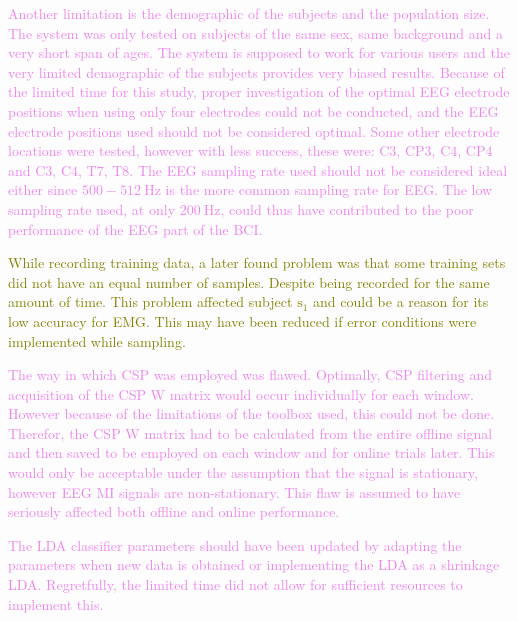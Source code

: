 \textcolor{violet}{Another limitation is the demographic of the subjects and the population size. The system was only tested on subjects of the same sex, same background and a very short span of ages. The system is supposed to work for various users and the very limited demographic of the subjects provides very biased results.}
\textcolor{violet}{Because of the limited time for this study, proper investigation of the optimal EEG electrode positions when using only four electrodes could not be conducted, and the EEG electrode positions used should not be considered optimal. Some other electrode locations were tested, however with less success, these were: $\text{C}3$, $\text{CP}3$, $\text{C}4$, $\text{CP}4$ and $\text{C}3$, $\text{C}4$, $\text{T}7$, $\text{T}8$. The EEG sampling rate used should not be considered ideal either since $500-512\:\text{Hz}$ is the more common sampling rate for EEG\:\cite{leebHybridBrainComputer2011}\cite{gordleevaRealTimeEEGEMG2020}\cite{zhangEEGEMGEOGBased2019}. The low sampling rate used, at only $200\:\text{Hz}$, could thus have contributed to the poor performance of the EEG part of the BCI.}

\textcolor{olive}{While recording training data, a later found problem was that some training sets did not have an equal number of samples. Despite being recorded for the same amount of time. This problem affected subject $\text{s}_1$ and could be a reason for its low accuracy for EMG. This may have been reduced if error conditions were implemented while sampling.}

\textcolor{violet}{The way in which CSP was employed was flawed. Optimally, CSP filtering and acquisition of the CSP W matrix would occur individually for each window. However because of the limitations of the toolbox used, this could not be done. Therefor, the CSP W matrix had to be calculated from the entire offline signal and then saved to be employed on each window and for online trials later. This would only be acceptable under the assumption that the signal is stationary, however EEG MI signals are non-stationary\:\cite{tyagiTimeFrequencyAnalysis2017}. This flaw is assumed to have seriously affected both offline and online performance.}

\textcolor{violet}{The LDA classifier parameters should have been updated by adapting the parameters when new data is obtained\:\cite{vidovicImprovingRobustnessMyoelectric2016} or implementing the LDA as a shrinkage LDA\:\cite{lotteReviewClassificationAlgorithms2018}. Regretfully, the limited time did not allow for sufficient resources to implement this.}

